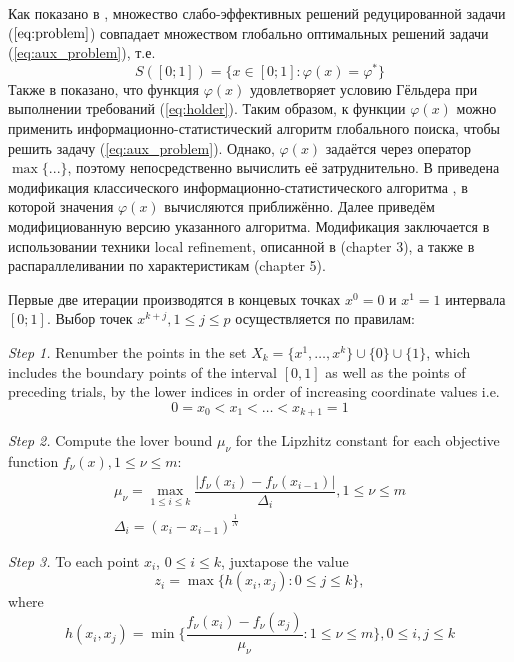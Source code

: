 \documentclass{llncs}
\begin{document}
Как показано в \cite{markinStrongin1993}, множество слабо-эффективных решений редуцированной задачи (\(\ref{eq:problem}\)) совпадает множеством глобально оптимальных решений задачи (\ref{eq:aux_problem}), т.е.
\begin{equation}
  \label{eq:s}
  S([0;1])=\{x\in [0;1]:\varphi(x)=\varphi^*\}
\end{equation}
Также в \cite{markinStrongin1993} показано, что функция \(\varphi(x)\) удовлетворяет условию Гёльдера при выполнении требований (\ref{eq:holder}). Таким образом, к функции \(\varphi(x)\) можно применить информационно-статистический алгоритм глобального поиска, чтобы решить задачу (\ref{eq:aux_problem}). Однако, \(\varphi(x)\) задаётся через оператор \(\max\{...\}\), поэтому непосредственно вычислить её затруднительно. В \cite{markinStrongin1993} приведена модификация классического информационно-статистического алгоритма \cite{mixedAlg}, в которой значения \(\varphi(x)\) вычисляются приближённо. Далее приведём модифициованную версию указанного алгоритма. Модификация заключается в использовании техники local refinement, описанной в \cite{strOptBook}(chapter 3), а также в распараллеливании по характеристикам \cite{strOptBook}(chapter 5).

Первые две итерации производятся в концевых точках \(x^0=0\) и \(x^1=1\) интервала \([0;1]\). Выбор точек \(x^{k+j}, 1\leqslant j\leqslant p\) осуществляется по правилам:

\textit{Step 1.} Renumber the points in the set \(X_k=\{x^1,\dotsc,x^k\}\cup\{0\}\cup\{1\}\), which includes the boundary points of the interval \([0,1]\) as well as the points of preceding trials, by the lower indices in order of increasing coordinate values  i.e.
\begin{displaymath}
  0=x_0<x_1<\dotsc<x_{k+1}=1
\end{displaymath}

\textit{Step 2.} Compute the lover bound \(\mu_\nu\) for the Lipzhitz constant for each objective function \(f_\nu(x),1\leqslant\nu\leqslant m\):
\begin{gather}
\label{eq:step2_1}
\mu_\nu=\max_{1\leqslant i\leqslant k}\dfrac{|f_\nu(x_i)-f_\nu(x_{i-1})|}{\Delta_i}, 1\leqslant \nu\leqslant m \\
\label{eq:step2_2}
\Delta_i=(x_i-x_{i-1})^\frac{1}{N}
\end{gather}

\textit{Step 3.} To each point \(x_i\), \(0\leqslant i\leqslant k\), juxtapose the value
\begin{equation}
  z_i=\max\{h(x_i,x_j):0\leqslant j\leqslant k\},
\end{equation}
where
\begin{equation}
  h(x_i,x_j)=\min\{\frac{f_\nu(x_i)-f_\nu(x_j)}{\mu_\nu}:1\leqslant \nu\leqslant m\}, 0\leqslant i,j\leqslant k
\end{equation}
\end{document}
